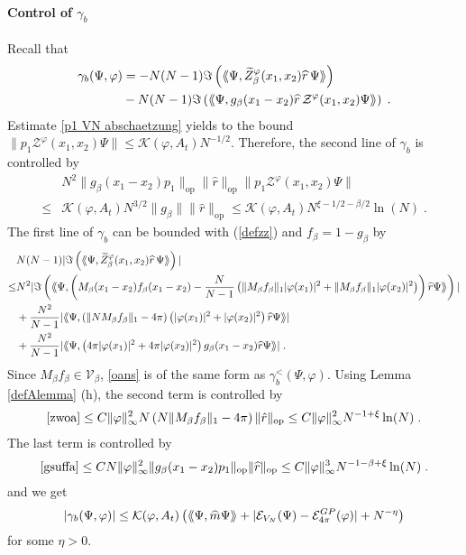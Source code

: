 \documentclass[11pt, english, american]{article}
\newcommand{\laa}{\langle\hspace{-0.08cm}\langle}
\newcommand{\raa}{\rangle\hspace{-0.08cm}\rangle}
\renewcommand{\phi}{\varphi}
\newcommand{\potdiffneu}{\widetilde{Z}_{\beta}}
\newcommand{\asalt}{\gamma^<_b}
\newcommand{\as}{\gamma_b}
\begin{document}
\paragraph{Control of $\as$}
Recall that
\begin{align*}\as (\Psi,\phi)&=-N(N-1)\Im\left(\laa\Psi ,
\potdiffneu^{\phi}(x_1,x_2)\widehat{r}\,
\Psi\raa\right)\\&
%
-N(N-1)\Im\left(\laa\Psi ,g_{\beta}(x_{1}-x_{2})
\widehat{r}\,\mathcal{Z}^\phi (x_1,x_2) \Psi\raa\right)\;.
\end{align*}
Estimate \eqref{p1 VN abschaetzung} yields to the bound
$\|p_1 \mathcal{Z}^\phi (x_1,x_2)\Psi\| \leq   \mathcal{K}(\phi, A_t)  N^{-1/2}$. 
Therefore, the second line of $\gamma_b$ is controlled by
\begin{align*} 
&N^2\|g_{\beta}(x_{1}-x_{2})
p_{1}\|_{\text{op}}\|\widehat{r}\|_{\text{op}}\|p_1\mathcal{Z}^\phi (x_1,x_2)\Psi\|
%
\\
\leq & \mathcal{K}(\phi, A_t)N^{3/2}\|g_{\beta}\| \|\widehat{r}\|_{\text{op}}
\leq   \mathcal{K}(\phi, A_t) N^{\xi-1/2-\beta/2} \ln(N) \;.
\end{align*}
The first line of $\as$ can be bounded with (\ref{defzz}) and $f_{\beta}=1-g_{\beta}$ by
\begin{align} 
\nonumber
&N(N-1)|\Im\left(\laa\Psi ,
\potdiffneu^{\phi}(x_1,x_2)\widehat{r}\,
\Psi\raa\right)|
\\
\leq&
\label{oans}
N^2 |
\Im
\left(
\laa\Psi ,
\left(
	M_{\beta}(x_1-x_2)f_{\beta}(x_{1}-x_{2})-
	\frac{N}{N-1}
		\left(
		\| M_{\beta}f_{\beta}  \|_1
		|\phi(x_1)|^2 
		+\|  M_{\beta}f_{\beta} \|_1
		|\phi(x_2)|^2
	\right)
\right)\widehat{r}
\Psi\raa
\right)
|
\\&+
\label{zwoa}
\frac{N^2}{N-1}  |\laa\Psi ,
\left(
\| N M_{\beta}f_{\beta} \|_1- 4\pi\right)\left(  |\phi(x_1)|^2+|\phi(x_2)|^2\right)\widehat{r}
\Psi\raa|
\\&+
\label{gsuffa}
\frac{N^2}{N-1}|\laa\Psi ,
  \left(4\pi|\phi(x_1)|^2+4\pi|\phi(x_2)|^2\right)g_{\beta}(x_{1}-x_{2})
\widehat{r}\Psi\raa|
\;.
\end{align}
Since $M_{\beta}f_{\beta} \in \mathcal{V}_\beta$,
 \eqref{oans} is of the same form as $\asalt (\Psi,\varphi)$. 
Using Lemma \ref{defAlemma} (h), the second term is controlled by
\begin{align*}
\eqref{zwoa}
\leq
C
 \| \varphi \|_\infty^2 
N  
\left(
N\|M_\beta f_\beta\|_1-4 \pi
\right)
\|\hat{r}\|_{\text{op}}
\leq
C  \| \varphi \|_\infty^2 
N^{-1+ \xi}  \ln(N)
\;.
\end{align*}
The last term is controlled by
$$
\eqref{gsuffa} \leq
C N\|\phi\|_\infty^2\|g_{\beta}(x_{1}-x_{2})
p_{1}\|_{\text{op}}\|\widehat{r}\|_{\text{op}}\leq
C\|\phi\|_\infty^3N^{-1-\beta+\xi} \ln(N)
\;.
$$
and we get
$$|\as (\Psi,\phi)|\leq  
\mathcal{K}(\phi, A_t)
\left(
\laa \Psi, \widehat{m} \Psi \raa + |\mathcal{E}_{V_N}(\Psi)
- \mathcal{E}^{GP}_{4 \pi}(\phi) |
 +N^{-\eta}\right)$$
for some $\eta>0$.
\end{document}
